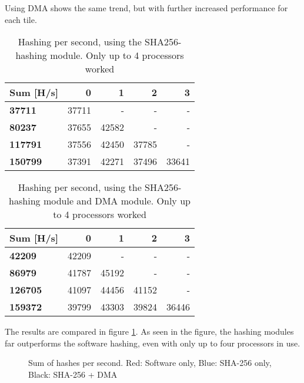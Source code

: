 Using DMA shows the same trend, but with further increased performance for each tile.

\begin{table}
\begin{tabular}{| l || r r r r |}
  \hline 
  \textbf{Sum} [H/s] & \textbf{0} & \textbf{1} & \textbf{2} & \textbf{3}\\
  \hline                       
  \textbf{37711} & 37711 & - & - & - \\
  \textbf{80237} & 37655 & 42582 & - & - \\
  \textbf{117791} & 37556 & 42450 & 37785 & - \\
  \textbf{150799} & 37391 & 42271 & 37496 & 33641 \\
  \hline  
\end{tabular}
\caption{Hashing per second, using the SHA256-hashing module. Only up to 4 processors worked}
\label{tab:Perf-SHA}
\end{table}

\begin{table}
\begin{tabular}{| l || r r r r |}
  \hline 
  \textbf{Sum} [H/s] & \textbf{0} & \textbf{1} & \textbf{2} & \textbf{3}\\
  \hline                       
  \textbf{42209} & 42209 & - & - & - \\
  \textbf{86979} & 41787 & 45192 & - & - \\
  \textbf{126705} & 41097 & 44456 & 41152 & - \\
  \textbf{159372} & 39799 & 43303 & 39824 & 36446 \\
  \hline  
\end{tabular}
\caption{Hashing per second, using the SHA256-hashing module and DMA module. Only up to 4 processors worked}
\label{tab:Perf-SHADMA}
\end{table}

The results are compared in figure \ref{fig:Perf-plot}. %
As seen in the figure, the hashing modules far outperforms the software hashing, even with only up to four processors in use.

\begin{figure}
	\caption{Sum of hashes per second. Red: Software only, Blue: SHA-256 only, Black: SHA-256 + DMA}
	\label{fig:Perf-plot}
\end{figure}

